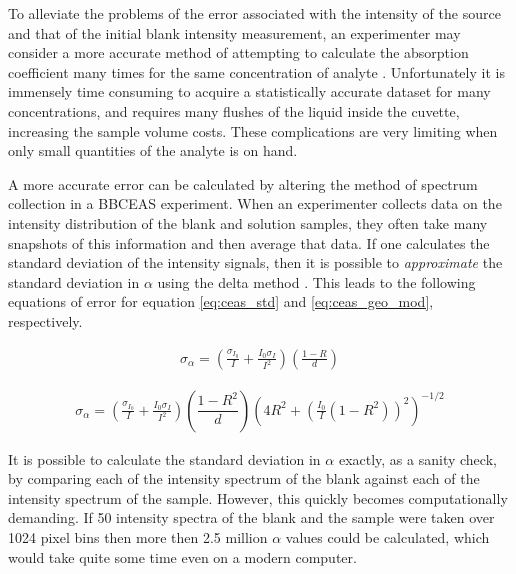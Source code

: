 To alleviate the problems of the error associated with the intensity
of the source and that of the initial blank intensity measurement, an
experimenter may consider a more accurate method of attempting to calculate
the absorption coefficient many times for the same concentration of analyte
\cite{Islam:2007ea}. Unfortunately it is immensely time consuming to acquire
a statistically accurate dataset for many concentrations, and requires many
flushes of the liquid inside the cuvette, increasing the sample volume costs.
These complications are very limiting when only small quantities of the
analyte is on hand.

A more accurate error can be calculated by altering the method of spectrum
collection in a \ac{BBCEAS} experiment. When an experimenter collects data
on the intensity distribution of the blank and solution samples, they often
take many snapshots of this information and then average that data. If one
calculates the standard deviation of the intensity signals, then it is
possible to \emph{approximate} the standard deviation in $\alpha$ using the
delta method \cite{Casella:2002tp}. This leads to the following equations
of error for equation \eqref{eq:ceas_std} and \eqref{eq:ceas_geo_mod},
respectively.

    \begin{align}
      \sigma_\alpha = \left(\frac{\sigma_{I_0}}{I} +
             \frac{I_0\sigma_I}{I^2}\right)
            \left(\frac{1-R}{d}\right)\label{eq:ceas_err_std}
    \end{align}


    \begin{align}
      \sigma_\alpha = \left(\frac{\sigma_{I_0}}{I} +
             \frac{I_0\sigma_I}{I^2}\right)
            \left(\dfrac{1-R^2}{d}\right)\left(4R^2+\left(
                                     \frac{I_0}{I}(1-R^2)\right)^2
                                     \right)^{-1/2}\label{eq:ceas_err_geo}
    \end{align}

It is possible to calculate the standard deviation in $\alpha$ exactly, as
a sanity check, by comparing each of the intensity spectrum of the blank
against each of the intensity spectrum of the sample. However, this quickly
becomes computationally demanding. If 50 intensity spectra of the blank and
the sample were taken over 1024 pixel bins then more then 2.5 million $\alpha$
values could be calculated, which would take quite some time even on a modern
computer.



